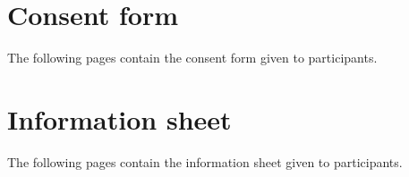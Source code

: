 \chapter{Consent form}
The following pages contain the consent form given to participants.




\chapter{Information sheet}

The following pages contain the information sheet given to participants.

